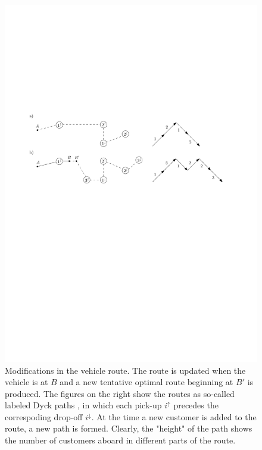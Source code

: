 \documentclass[dissertation,draft*]{aaltoseries}
\begin{document}
\begin{figure}[ht]
\begin{center}
\includegraphics[width=1.0\textwidth]{dynamicexample04.pdf}
\caption{Modifications in the vehicle route. The route is updated when the vehicle is at $B$ and 
a new tentative optimal route beginning at $B'$ is produced. 
The figures on the right show the routes as so-called labeled Dyck 
paths \cite{cori}, in which each pick-up $i^{\uparrow}$ precedes the correspoding drop-off $i^{\downarrow}$. 
At the time a new customer is added to the route, a new path is formed. Clearly, the "height" of the path
shows the number of customers aboard in different parts of the route.}
\label{dynamicexample02}
\end{center}
\end{figure}
\end{document}
